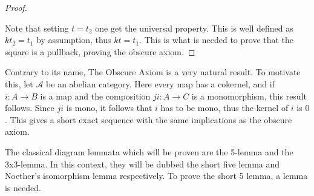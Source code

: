 \begin{proof}
\begin{center}
        \end{center}
        Note that setting $t=t_2$ one get the universal property. This is well defined as $kt_2=t_1$ by assumption, thus $kt=t_1$. This is what is needed to prove that the square is a pullback, proving the obscure axiom.
    \end{proof}

    Contrary to its name, The Obscure Axiom is a very natural result. To motivate this, let $\mathcal{A}$ be an abelian category. Here every map has a cokernel, and if $i : A \rightarrow B$ is a map and the composition $ji : A \rightarrow C$ is a monomorphism, this result follows. Since $ji$ is mono, it follows that $i$ has to be mono, thus the kernel of $i$ is $0$. This gives a short exact sequence with the same implications as the obscure axiom.
    \begin{center}
    \end{center}

    The classical diagram lemmata which will be proven are the 5-lemma and the 3x3-lemma. In this context, they will be dubbed the short five lemma and Noether's isomorphism lemma respectively. To prove the short 5 lemma, a lemma is needed.


